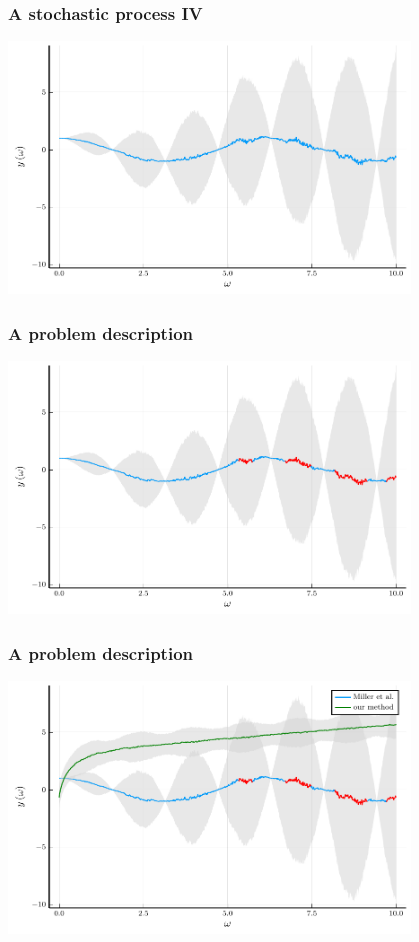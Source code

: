 \documentclass[aspectratio=169]{beamer}
\begin{document}
\begin{frame} %
    \frametitle{A stochastic process IV}
    \centering
    \includegraphics[width=0.8\textwidth]{./PlotSources/std1.pdf}
\end{frame}

\begin{frame} %
  \frametitle{A problem description}
    \centering
    \includegraphics[width=0.8\textwidth]{./PlotSources/std2.pdf}
\end{frame}

\begin{frame} %
  \frametitle{A problem description}
    \centering
    \includegraphics[width=0.8\textwidth]{./PlotSources/std3.pdf}
\end{frame}
\end{document}
